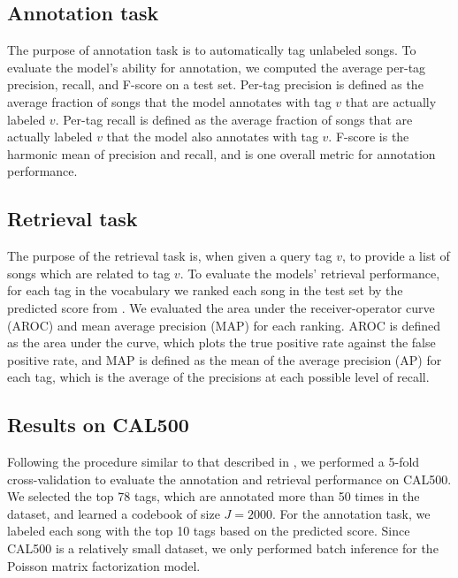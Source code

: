 \subsection{Annotation task}
The purpose of annotation task is to automatically tag unlabeled songs. To evaluate the model's ability for annotation, we computed the average per-tag precision, recall, and F-score on a test set. Per-tag precision is defined as the average fraction of songs that the model annotates with tag $v$ that are actually labeled $v$. Per-tag recall is defined as the average fraction of songs that are actually labeled $v$ that the model also annotates with tag $v$. F-score is the harmonic mean of precision and recall, and is one overall metric for annotation performance.

\subsection{Retrieval task}
The purpose of the retrieval task is, when given a query tag $v$, to provide a list of songs which are related to tag $v$. To evaluate the models' retrieval performance, for each tag in the vocabulary we ranked each song in the test set by the predicted score from . We evaluated the area under the receiver-operator curve (AROC) and mean average precision (MAP) for each ranking. AROC is defined as the area under the curve, which plots the true positive rate against the false positive rate, and MAP is defined as the mean of the average precision (AP) for each tag, which is the average of the precisions at each possible level of recall. 

\subsection{Results on CAL500}
Following the procedure similar to that described in \citet{hoffman2009easy,xie2011music}, we performed a 5-fold cross-validation to evaluate the annotation and retrieval performance on CAL500. We selected the top 78 tags, which are annotated more than 50 times in the dataset, and learned a codebook of size $J = 2000$. For the annotation task, we labeled each song with the top 10 tags based on the predicted score. Since CAL500 is a relatively small dataset, we only performed batch inference for the Poisson matrix factorization model.

